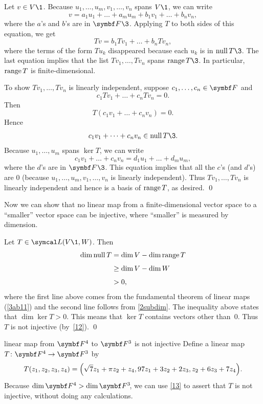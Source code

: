 Let $v \in V\1$.  Because $u_1, \dots, u_m,  v_1, \dots, v_n$ spans $V\1$, we can
write
\[
v = a_1 u_1 + \dots + a_m u_m + b_1 v_1 + \dots + b_n v_n,
\]
where the $a$'s and $b$'s are in $\F{}\3$.  Applying $T$ to both sides of this equation, we  get
\[
Tv = b_1 Tv_1 + \dots + b_n Tv_n,
\]
where the terms of the form $Tu_k$ disappeared because each $u_k$ is in $\ker T\3$.
The last equation implies that the list $Tv_1, \dots, Tv_n$ spans $\ran T\3$.  In
particular, $\ran T$ is finite-dimensional.

To show $Tv_1, \dots, Tv_n$ is linearly independent, suppose
$c_1, \dots, c_n \in \F{}$ and
\[
c_1 Tv_1 + \dots + c_n Tv_n = 0.
\]
Then
\[
T(c_1 v_1 + \dots + c_n v_n) = 0.
\]
Hence
\[
c_1 v_1 + \dots + c_n v_n \in \ker T\3.
\]
Because $u_1, \dots, u_m$ spans $\ker T$, we can write
\[
c_1 v_1 + \dots + c_n v_n = d_1 u_1 + \dots + d_m u_m,
\]
where the $d$'s are in $\F{}\3$. This equation implies that all the $c$'s (and $d$'s) are
$0$ (because $u_1, \dots, u_m, v_1, \dots, v_n$ is linearly independent).  Thus
$Tv_1, \dots, Tv_n$ is linearly independent and hence is a basis of $\ran T$, as desired.
\qed

Now we can show that no linear map from a finite-dimensional vector space to
a ``smaller'' vector space can be injective, where ``smaller'' is measured by
dimension.


\proof
Let $T \in \L(V\1,W)$.  Then
\begin{align*}
\dim \ker T &= \dim V - \dim \ran T \\[4bp]
&\ge \dim V - \dim W \\[4bp]
&> 0,
\end{align*}
where the first line above comes from the fundamental theorem of linear maps (\ref{3ab11}) and the second line follows from \ref{2subdim}. The inequality above states that \mbox{$\dim \ker T > 0$}.  This means that $\ker T$ contains vectors other than~$0$.
Thus $T$ is not injective (by~\ref{12}).
\qed

\begin{example}{linear map from\/ $\F4$ to $\F3$ is not injective}
Define a linear map $\fun T {\F4} {\F3}$ by
\[
T(z_1, z_2, z_3, z_4)
= \paren[\Big]{ \sqrt{7} z_1 + \pi z_2 + z_4, 97 z_1 + 3 z_2 + 2z_3, z_2 + 6z_3 + 7z_4 }.
\]
Because $\dim \F4 > \dim \FF3$, we can use \ref{13} to assert that $T$ is not injective, without doing any calculations.
\end{example}

